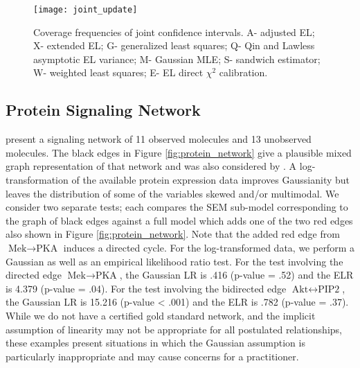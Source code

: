 \documentclass[notitlepage]{article}
\begin{document}

\begin{figure}[htbp]
\centering
\texttt{[image: joint\_update]}
\caption{\label{fig:confInt}Coverage frequencies of joint confidence intervals. A- adjusted EL; X- extended EL; G- generalized least squares; Q- Qin and Lawless asymptotic EL variance; M- Gaussian MLE; S- sandwich estimator; W- weighted least squares; E- EL direct $\chi^2$ calibration.}
\end{figure}

\subsection{Protein Signaling Network}\label{sec:sachsExample}

\citet[Figure 2]{sachs2005causal} present a signaling network of 11
observed molecules and 13 unobserved molecules. The black edges in
Figure \ref{fig:protein_network} give a plausible mixed graph
representation of that network and was also considered by
\citet{drton2016computation}.  A log-transformation of the available
protein expression data improves Gaussianity but leaves the
distribution of some of the variables skewed and/or multimodal.  We consider two separate tests; each compares the SEM sub-model corresponding to the graph of black edges against a full model which adds one of the two red edges also shown in Figure
\ref{fig:protein_network}. Note that the added red edge from $\text{Mek} \rightarrow \text{PKA}$ induces a directed cycle.   For
the log-transformed data, we perform a Gaussian as well as an
empirical likelihood ratio test.  For the test involving the directed edge $\text{Mek} \rightarrow \text{PKA}$, the Gaussian LR is .416 (p-value = .52) and the ELR is 4.379 (p-value = .04). For the test involving the bidirected edge $\text{Akt} \leftrightarrow \text{PIP2}$, the Gaussian LR is 15.216 (p-value < .001) and the ELR is .782 (p-value = .37).  While we do not have a
certified gold standard network, and the implicit assumption of
linearity may not be appropriate for all postulated relationships,
these examples present situations in which the Gaussian assumption is
particularly inappropriate and may cause concerns for a practitioner.
\end{document}
